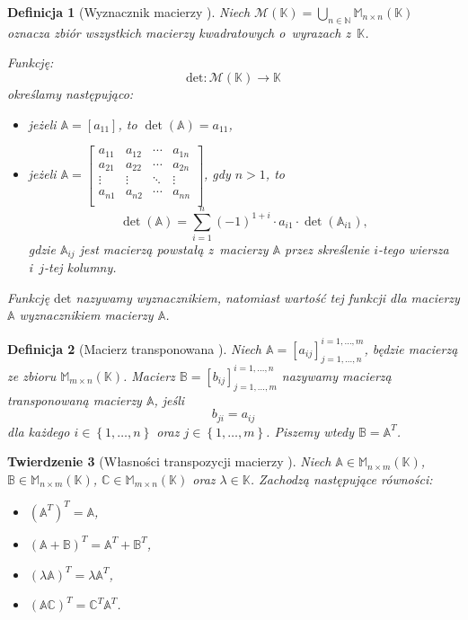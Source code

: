 \documentclass[12pt,a4paper]{report}
\newtheorem{df}{Definicja}[chapter]
\newtheorem{tw}[df]{Twierdzenie}
\newcommand{\set}[1]{\left\lbrace {#1} \right\rbrace}
\newcommand{\setK}{\mathbb{K}}
\newcommand{\setN}{\mathbb{N}}
\newcommand{\wyznacznik}[1]{\operatorname{det}\left({#1} \right)}
\begin{document}
\begin{df}[Wyznacznik macierzy {\citep[Sec 10.1, Def. 10.1]{alzega}}]
Niech $\mathcal{M}(\setK)=\bigcup_{n\in \setN} \mathbb{M}_{n \times n}(\setK)$ oznacza zbiór wszystkich macierzy kwadratowych o~wyrazach z~$\setK$.

Funkcję:
$$
\mathrm{det} : \mathcal{M}(\setK) \to \setK
$$ 
określamy następująco:
\begin{itemize}
\item jeżeli $\mathbb{A}=[a_{11}]$, to $\wyznacznik{\mathbb{A}}=a_{11}$,
\item jeżeli $\mathbb{A} = \left[
        \begin{array}{cccc}
         a_{11} & a_{12} & \cdots & a_{1n} \\
         a_{21} & a_{22} & \cdots & a_{2n} \\
         \vdots & \vdots & \ddots & \vdots \\
         a_{n1} & a_{n2} & \cdots & a_{nn} \\
         \end{array}
      \right]$, gdy $n>1$, to
$$
\wyznacznik{\mathbb{A}} = \sum_{i=1}^n (-1)^{1+i} \cdot a_{i1} \cdot \wyznacznik{\mathbb{A}_{i1}},
$$
gdzie 
$\mathbb{A}_{ij}$ jest macierzą powstałą z~macierzy $\mathbb{A}$ przez skreślenie $i$-tego wiersza i~$j$-tej kolumny.
\end{itemize}
Funkcję $\mathrm{det}$ nazywamy wyznacznikiem, natomiast wartość tej funkcji dla macierzy $\mathbb{A}$ wyznacznikiem macierzy $\mathbb{A}$.
\end{df}


\begin{df}[Macierz transponowana {\citep[Sec 8.1 ]{alzega}}]
Niech $\mathbb{A} = [a_{ij}]_{j = 1, \ldots, n}^{i = 1, \ldots , m}$, będzie macierzą ze zbioru $\mathbb{M}_{m \times n}(\setK)$.
Macierz $\mathbb{B} = [b_{ij}]_{j = 1, \ldots, m}^{i = 1, \ldots , n}$ nazywamy macierzą transponowaną macierzy $\mathbb{A}$, jeśli 
$$
b_{ji} = a_{ij}
$$ 
dla każdego $i \in \set{1, \ldots, n}$ oraz $j \in \set{1, \ldots ,m}$. Piszemy wtedy $\mathbb{B} = \mathbb{A}^T$.
\end{df}

\begin{tw}[Własności transpozycji macierzy {\citep[Sec 5.1 Tw. 5.1]{ealIII}}]
Niech $\mathbb{A} \in \mathbb{M}_{n \times m} (\setK)$, $\mathbb{B} \in \mathbb{M}_{n \times m} (\setK)$, $\mathbb{C} \in \mathbb{M}_{m \times n} (\setK)$ oraz $\lambda \in \setK$.
Zachodzą następujące równości:
\begin{itemize}
\item $(\mathbb{A}^T)^T = \mathbb{A}$,
\item $(\mathbb{A} + \mathbb{B})^T = \mathbb{A}^T + \mathbb{B}^T$,
\item $(\lambda \mathbb{A})^T = \lambda \mathbb{A}^T$,
\item $(\mathbb{A}\mathbb{C})^T = \mathbb{C}^T \mathbb{A}^T$.
\end{itemize}
\end{tw}
\end{document}
